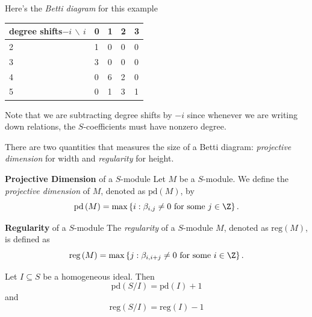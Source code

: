 \documentclass[co439]{subfiles}
\begin{document}
\begin{example}{}
        Here's the \emph{Betti diagram} for this example

        \noindent
        \begin{tabularx}{\textwidth}{|X|X|X|X|X|}
            \hline
            degree shifts$-i$ $\backslash$ $i$ & 0 & 1 & 2 & 3 \\
            \hline
            2 & 1 & 0 & 0 & 0 \\
            3 & 3 & 0 & 0 & 0 \\
            4 & 0 & 6 & 2 & 0 \\
            5 & 0 & 1 & 3 & 1 \\
            \hline
        \end{tabularx}

        Note that we are subtracting degree shifts by $-i$ since whenever we are writing down relations, the $S$-coefficients must have nonzero degree.
    \end{example}

    \rruleline

    \np There are two quantities that measures the size of a Betti diagram: \textit{projective dimension} for width and \textit{regularity} for height.
    
    \begin{definition}{\textbf{Projective Dimension} of a $S$-module}
        Let $M$ be a $S$-module. We define the \emph{projective dimension} of $M$, denoted as $\text{pd}\left( M \right)$, by
        \begin{equation*}
            \text{pd}\left( M \right) = \max\left\lbrace i:\beta_{i,j}\neq 0\text{ for some $j\in\Z$} \right\rbrace.
        \end{equation*}
    \end{definition}

    \begin{definition}{\textbf{Regularity} of a $S$-module}
        The \emph{regularity} of a $S$-module $M$, denoted as $\text{reg}\left( M \right)$, is defined as
        \begin{equation*}
            \text{reg}\left( M \right) = \max\left\lbrace j:\beta_{i,i+j} \neq 0 \text{ for some $i\in\Z$} \right\rbrace.
        \end{equation*}
    \end{definition}

    \begin{prop}{}
        Let $I\subseteq S$ be a homogeneous ideal. Then
        \begin{equation*}
            \text{pd}\left( S /I \right) = \text{pd}\left( I \right) + 1
        \end{equation*}
        and
        \begin{equation*}
            \text{reg}\left( S /I \right) = \text{reg}\left( I \right) - 1
        \end{equation*}
    \end{prop}
\end{document}
